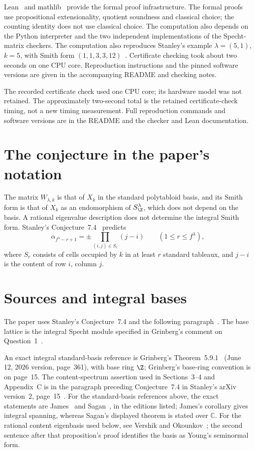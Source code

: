 Lean~\cite{lean} and mathlib~\cite{mathlib} provide the formal proof
infrastructure. The formal proofs use propositional extensionality, quotient soundness and classical choice; the counting identity does not use classical choice. The computation also depends on the Python interpreter and
the two independent implementations of the Specht-matrix checkers.
The computation also reproduces Stanley's example $\lambda=(5,1)$, $k=5$, with Smith form $(1,1,3,3,12)$~\cite[example following Conjecture~7.4]{stanley}. Certificate checking took about two seconds on one CPU core. Reproduction instructions and the
pinned software versions are given in the accompanying README and
checking notes.

The recorded certificate check used one CPU core; its hardware model was not retained. The approximately two-second total is the retained certificate-check timing, not a new timing measurement. Full reproduction commands and software versions are in the README and the checker and Lean documentation.

\section{The conjecture in the paper's notation}
The matrix $W_{\lambda,k}$ is that
of $X_k$ in the standard polytabloid basis, and its Smith form is that of
$X_k$ as an endomorphism of $S^\lambda_\Z$, which does not depend on the
basis.
A rational eigenvalue description does not determine the integral Smith
form. Stanley's Conjecture~7.4~\cite{stanley} predicts
\[
\alpha_{f^\lambda-r+1}=\pm\prod_{(i,j)\in S_r}(j-i)
\qquad(1\le r\le f^\lambda),
\]
where $S_r$ consists of cells occupied by $k$ in at least $r$ standard
tableaux, and $j-i$ is the content of row $i$, column $j$.

\section{Sources and integral bases}\label{sec:sources}
The paper uses Stanley's Conjecture~7.4 and the following
paragraph~\cite{stanley}. The base lattice is the integral Specht module
specified in Grinberg's comment on Question~1~\cite{mo}.

An exact integral standard-basis reference is Grinberg's
Theorem~5.9.1~\cite{grinberg} (June 12, 2026 version, page~361), with base
ring $\Z$; Grinberg's base-ring convention is on page~15. The content-spectrum
assertion used in Sections~3--4 and Appendix~C is in the paragraph preceding Conjecture~7.4 in Stanley's arXiv version~2, page~15~\cite{stanley}. For the standard-basis references above, the exact statements are
James~\cite[Theorem~8.4, page~29, and Corollary~8.6, page~30]{james}
and Sagan~\cite[Theorem~2.6.5(1), page~74]{sagan}, in the editions listed;
James's corollary gives integral spanning, whereas Sagan's displayed theorem
is stated over $\mathbb C$. For the rational content eigenbasis used below,
see Vershik and Okounkov~\cite[arXiv version~1, Corollary~2.10 and the following paragraph, page~13,
Theorem~5.8, page~21, and Proposition~6.1, page~22]{vo}; the second sentence after
that proposition's proof identifies the basis as Young's seminormal form.


